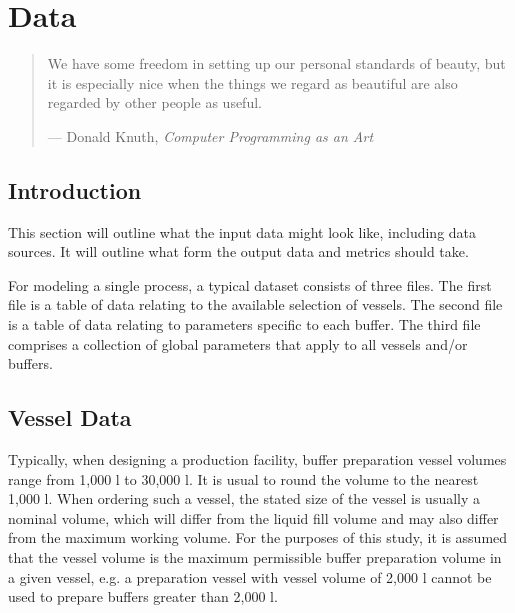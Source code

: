 %
%
%
%

\chapter{Data}\label{C.data}

\begin{quote}
We have some freedom in setting up our personal standards of beauty, but it is
especially nice when the things we regard as beautiful are also regarded by
other people as useful.

\hspace{2cm}--- Donald Knuth, \emph{Computer Programming as an Art}
\end{quote}

\section{Introduction}\label{S.intro3}

This section will outline what the input data might look like, including data
sources.
It will outline what form the output data and metrics should take.

For modeling a single process, a typical dataset consists of three files.
The first file is a table of data relating to the available selection of
vessels.
The second file is a table of data relating to parameters specific
to each buffer.
The third file comprises a collection of global parameters
that apply to all vessels and/or buffers.

\section{Vessel Data}\label{S.data1}

Typically, when designing a production facility, buffer preparation vessel 
volumes range from 1,000 l to 30,000 l.
It is usual to round the volume to the nearest 1,000 l.
When ordering such a vessel, the stated size of the vessel is usually a nominal
volume, which will differ from the liquid fill volume and may also differ from
the maximum working volume.
For the purposes of this study, it is assumed that the vessel volume is the
maximum permissible buffer preparation volume in a given vessel, e.g. a 
preparation vessel with vessel volume of 2,000 l cannot be used to prepare
buffers greater than 2,000 l.

